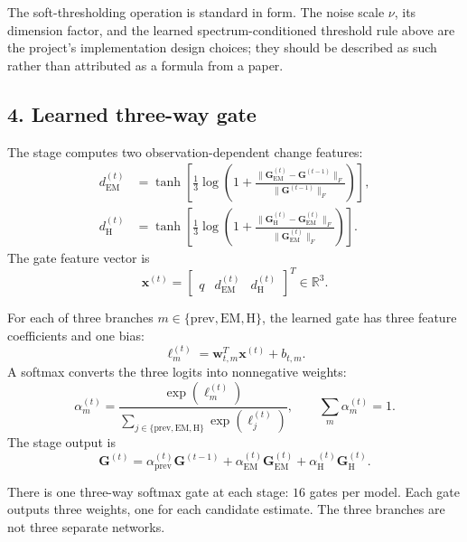 ﻿\documentclass[11pt,a4paper]{article}
\begin{document}
The soft-thresholding operation is standard in form. The noise scale
\(\nu\), its dimension factor, and the learned spectrum-conditioned
threshold rule above are the project's implementation design choices;
they should be described as such rather than attributed as a formula
from a paper.

\subsection{4. Learned three-way gate}

The stage computes two observation-dependent change features:
\begin{align}
d_{\mathrm{EM}}^{(t)}
&=
\tanh\!\left[
\frac{1}{3}
\log\!\left(
1+
\frac{\|\bm{G}_{\mathrm{EM}}^{(t)}-\bm{G}^{(t-1)}\|_F}
{\|\bm{G}^{(t-1)}\|_F}
\right)
\right],\\
d_{\mathrm{H}}^{(t)}
&=
\tanh\!\left[
\frac{1}{3}
\log\!\left(
1+
\frac{\|\bm{G}_{\mathrm{H}}^{(t)}-\bm{G}_{\mathrm{EM}}^{(t)}\|_F}
{\|\bm{G}_{\mathrm{EM}}^{(t)}\|_F}
\right)
\right].
\end{align}
The gate feature vector is
\[
\bm{x}^{(t)}
=
\begin{bmatrix}
q & d_{\mathrm{EM}}^{(t)} & d_{\mathrm{H}}^{(t)}
\end{bmatrix}^{T}
\in\mathbb{R}^{3}.
\]

For each of three branches \(m\in\{\mathrm{prev},\mathrm{EM},\mathrm{H}\}\),
the learned gate has three feature coefficients and one bias:
\begin{equation}
\ell_m^{(t)}
=
\bm{w}_{t,m}^{T}\bm{x}^{(t)}+b_{t,m}.
\end{equation}
A softmax converts the three logits into nonnegative weights:
\begin{equation}
\alpha_m^{(t)}
=
\frac{\exp(\ell_m^{(t)})}
{\sum_{j\in\{\mathrm{prev},\mathrm{EM},\mathrm{H}\}}
 \exp(\ell_j^{(t)})},
\qquad
\sum_m\alpha_m^{(t)}=1.
\end{equation}
The stage output is
\begin{equation}
\boxed{
\bm{G}^{(t)}
=
\alpha_{\mathrm{prev}}^{(t)}\bm{G}^{(t-1)}
+
\alpha_{\mathrm{EM}}^{(t)}\bm{G}_{\mathrm{EM}}^{(t)}
+
\alpha_{\mathrm{H}}^{(t)}\bm{G}_{\mathrm{H}}^{(t)}
}.
\end{equation}

There is one three-way softmax gate at each stage: \(16\) gates per
model. Each gate outputs three weights, one for each candidate estimate.
The three branches are not three separate networks.
\end{document}
